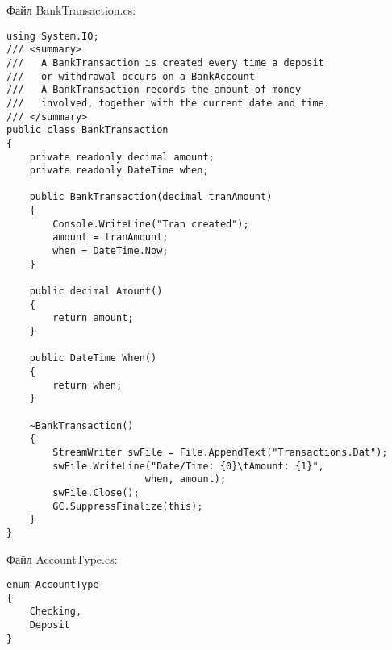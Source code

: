 Файл BankTransaction.cs:
\begin{lstlisting}[style=CSharpStyle]
using System.IO;
/// <summary>
///   A BankTransaction is created every time a deposit 
///   or withdrawal occurs on a BankAccount
///   A BankTransaction records the amount of money
///   involved, together with the current date and time.
/// </summary>
public class BankTransaction
{
    private readonly decimal amount;
    private readonly DateTime when;

    public BankTransaction(decimal tranAmount)
    {
        Console.WriteLine("Tran created");
        amount = tranAmount;
        when = DateTime.Now;
    }

    public decimal Amount()
    {
        return amount;
    }

    public DateTime When()
    {
        return when;
    }			 

    ~BankTransaction()
    {
        StreamWriter swFile = File.AppendText("Transactions.Dat");
        swFile.WriteLine("Date/Time: {0}\tAmount: {1}", 
                        when, amount);
        swFile.Close();
        GC.SuppressFinalize(this);
    }
}

\end{lstlisting}  

Файл AccountType.cs:
\begin{lstlisting}[style=CSharpStyle]
enum AccountType 
{ 
    Checking, 
    Deposit 
}
\end{lstlisting}  
\endinput
